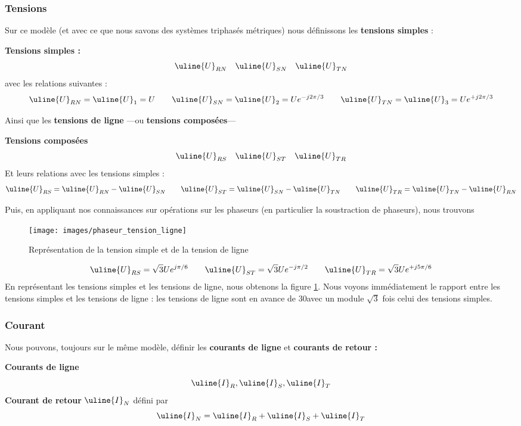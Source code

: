 \documentclass[12pt,a4paper]{article}
\newcommand{\ui}{\uline{I} }
\newcommand{\uu}{\uline{U} }
\begin{document}
\subsubsection{Tensions}
Sur ce modèle (et avec ce que nous savons des systèmes triphasés métriques) nous définissons les \textbf{tensions simples} :
\begin{blackbox}
	\textbf{Tensions simples :}
	\[\uu_{RN} \quad \uu_{SN} \quad \uu_{TN}\]
	avec les relations suivantes :
	\begin{equation}
		\uu_{RN} = \uu_1 = U \qquad \uu_{SN} = \uu_2 = Ue^{-j2\pi/3} \qquad \uu_{TN} = \uu_3 = Ue^{+j2\pi/3}
	\end{equation}
\end{blackbox}
Ainsi que les \textbf{tensions de ligne} ---ou \textbf{tensions composées}--- 
\begin{blackbox}
	\textbf{Tensions composées}	
	\[\uu_{RS} \quad \uu_{ST} \quad \uu_{TR}\] 
	Et leurs relations avec les tensions simples :
	\begin{equation}
		\uu_{RS} = \uu_{RN}-\uu_{SN} \qquad \uu_{ST} = \uu_{SN} - \uu_{TN} \qquad \uu_{TR} = \uu_{TN} - \uu_{RN}
	\end{equation}
\end{blackbox}
Puis, en appliquant nos connaissances sur opérations sur les phaseurs (en particulier la soustraction de phaseurs), nous trouvons 
\begin{figure}
	\centering	
	\texttt{[image: images/phaseur\_tension\_ligne]}
	\caption{Représentation de la tension simple et de la tension de ligne}
	\label{fig: phaseur tension ligne}
\end{figure}
\begin{equation}
	\uu_{RS} = \sqrt{3}Ue^{j\pi/6} \qquad \uu_{ST} = \sqrt{3}Ue^{-j\pi/2} \qquad \uu_{TR} = \sqrt{3}Ue^{+j5\pi/6}
\end{equation}
En représentant les tensions simples et les tensions de ligne, nous obtenons la figure \ref{fig: phaseur tension ligne}. Nous voyons immédiatement le rapport entre les tensions simples et les tensions de ligne : les tensions de ligne sont en avance de 30\degre avec un module $\sqrt{3}$ fois celui des tensions simples.

\subsubsection{Courant}
Nous pouvons, toujours sur le même modèle, définir les \textbf{courants de ligne} et \textbf{courants de retour :} 
\begin{blackbox}
	\textbf{Courants de ligne}
	\[\ui_R, \ui_S, \ui_T\] 
	\textbf{Courant de retour} $\ui_N$ défini par
	\begin{equation}
		\ui_N = \ui_R + \ui_S + \ui_T
	\end{equation}
\end{blackbox}
\end{document}
